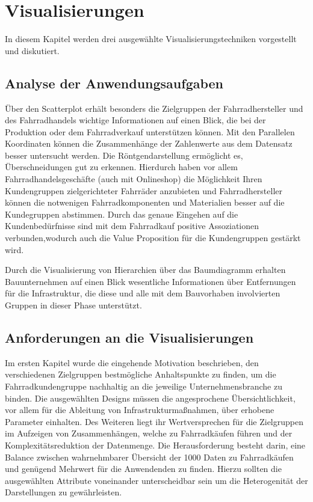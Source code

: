 \documentclass[usegeometry=true]{scrartcl}
\begin{document}
\section{Visualisierungen}
In diesem Kapitel werden drei ausgewählte Visualisierungstechniken vorgestellt und diskutiert.
\subsection{Analyse der Anwendungsaufgaben}
Über den Scatterplot erhält besonders die Zielgruppen der Fahrradhersteller und des Fahrradhandels wichtige Informationen auf einen Blick, die bei der Produktion oder dem Fahrradverkauf unterstützen können. 
Mit den Parallelen Koordinaten können die Zusammenhänge der Zahlenwerte aus dem Datensatz besser untersucht werden. Die Röntgendarstellung ermöglicht es, Überschneidungen gut zu erkennen. Hierdurch haben vor allem Fahrradhandelsgeschäfte (auch mit Onlineshop) die Möglichkeit Ihren Kundengruppen zielgerichteter Fahrräder anzubieten und Fahrradhersteller können die notwenigen Fahrradkomponenten und Materialien besser auf die Kundegruppen abstimmen.
Durch das genaue Eingehen auf die Kundenbedürfnisse sind mit dem Fahrradkauf positive Assoziationen verbunden,wodurch auch die Value Proposition für die Kundengruppen gestärkt wird. 

Durch die Visualisierung von Hierarchien über das Baumdiagramm erhalten Bauunternehmen auf einen Blick wesentliche Informationen über Entfernungen für die Infrastruktur, die diese und alle mit dem Bauvorhaben involvierten Gruppen in dieser Phase unterstützt.

\subsection{Anforderungen an die Visualisierungen}
Im ersten Kapitel wurde die eingehende Motivation beschrieben, den verschiedenen Zielgruppen bestmögliche Anhaltspunkte zu finden, um die Fahrradkundengruppe nachhaltig an die jeweilige Unternehmensbranche zu binden. Die ausgewählten Designs müssen die angesprochene Übersichtlichkeit, vor allem für die Ableitung von Infrastrukturmaßnahmen, über erhobene Parameter einhalten. Des Weiteren liegt ihr Wertversprechen für die Zielgruppen im Aufzeigen von Zusammenhängen, welche zu Fahrradkäufen führen und der Komplexitätsreduktion der Datenmenge. Die Herausforderung besteht darin, eine Balance zwischen wahrnehmbarer Übersicht der 1000 Daten zu Fahrradkäufen und genügend Mehrwert für die Anwendenden zu finden. Hierzu sollten die ausgewählten Attribute voneinander unterscheidbar sein um die Heterogenität der Darstellungen zu gewährleisten.
\end{document}
